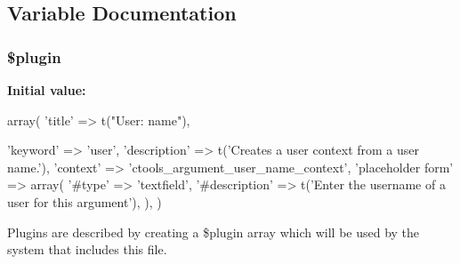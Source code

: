 \subsection{Variable Documentation}
\hypertarget{user__name_8inc_ada8a7130088351710bb02ed622d6bf65}{
\subsubsection[{\$plugin}]{\setlength{\rightskip}{0pt plus 5cm}\$plugin}}
\label{user__name_8inc_ada8a7130088351710bb02ed622d6bf65}
{\bfseries Initial value:}
\begin{DoxyCode}
 array(
  'title' => t("User: name"),
  
  'keyword' => 'user',
  'description' => t('Creates a user context from a user name.'),
  'context' => 'ctools_argument_user_name_context',
  'placeholder form' => array(
    '#type' => 'textfield',
    '#description' => t('Enter the username of a user for this argument'),
  ),
)
\end{DoxyCode}
Plugins are described by creating a \$plugin array which will be used by the system that includes this file. 
